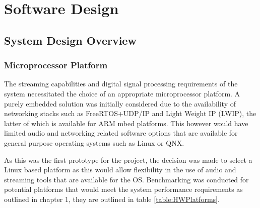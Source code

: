 \documentclass[main.tex]{subfiles}
\begin{document}
\chapter{Software Design}

\section{System Design Overview}
\subsection{Microprocessor Platform}
The streaming capabilities and digital signal processing requirements of the system necessitated the choice of an appropriate microprocessor platform. 
A purely embedded solution was initially considered due to the availability of networking stacks such as FreeRTOS+UDP/IP and Light Weight IP (LWIP), the latter of which is available for ARM mbed platforms. 
This however would have limited audio and networking related software options that are available for general purpose operating systems such as Linux or QNX.

\medskip
As this was the first prototype for the project, the decision was made to select a Linux based platform as this would allow flexibility in the use of audio and streaming tools that are available for the OS. 
Benchmarking was conducted for potential platforms that would meet the system performance requirements as outlined in chapter 1, they are outlined in table \ref{table:HWPlatforms}.
\end{document}
